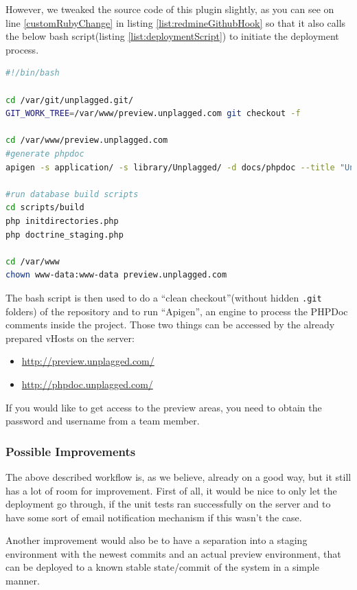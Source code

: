 However, we tweaked the source code of this plugin slightly, as you can see on line \ref{customRubyChange}
in listing \ref{list:redmineGithubHook} so that it also calls the below bash script(listing \ref{list:deploymentScript})
to initiate the deployment process.

\lstset{language=bash}
\begin{lstlisting}[caption=Deployment script, language=bash, label=list:deploymentScript]
#!/bin/bash

cd /var/git/unplagged.git/
GIT_WORK_TREE=/var/www/preview.unplagged.com git checkout -f

cd /var/www/preview.unplagged.com
#generate phpdoc
apigen -s application/ -s library/Unplagged/ -d docs/phpdoc --title "Unplagged Documentation" --todo yes

#run database build scripts
cd scripts/build
php initdirectories.php
php doctrine_staging.php

cd /var/www
chown www-data:www-data preview.unplagged.com
\end{lstlisting}

The bash script is then used to do a \enquote{clean checkout}(without hidden \texttt{.git} folders) of the repository and
to run \enquote{Apigen}, an engine to process the PHPDoc comments inside the project.
Those two things can be accessed by the already prepared vHosts on the server:

\begin{itemize}
\item \url{http://preview.unplagged.com/}
\item \url{http://phpdoc.unplagged.com/}
\end{itemize}

If you would like to get access to the preview areas, you need to obtain the password and username from a team member.

\subsubsection{Possible Improvements}

The above described workflow is, as we believe, already on a good way, but it still has a lot of room for improvement. 
First of all, it would
be nice to only let the deployment go through, if the unit tests ran successfully on the server and to have some sort of 
email notification mechanism if this wasn't the case.

Another improvement would also be to have a separation into a staging environment with the newest commits and an 
actual preview environment, that can be deployed to a known stable state/commit of the system in a simple manner.

